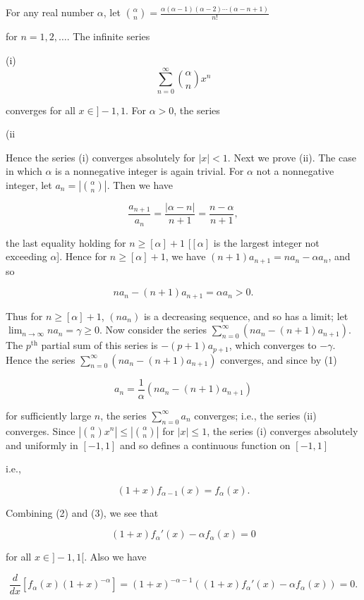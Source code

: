 For any real number $\alpha$, let $\binom{\alpha}{n} = \frac{\alpha(\alpha - 1)(\alpha - 2) \cdots (\alpha - n + 1)}{n!}$

for $n = 1, 2, \ldots$. The infinite series

(i) $$\sum_{n=0}^{\infty} \binom{\alpha}{n} x^n$$

converges for all $x \in ]-1, 1$. For $\alpha > 0$, the series

(ii

Hence the series (i) converges absolutely for $|x| < 1$. Next we prove (ii). The case in which $\alpha$ is a nonnegative integer is again trivial. For $\alpha$ not a nonnegative integer, let $a_n = \left| \binom{\alpha}{n} \right|$. Then we have

$$\frac{a_{n+1}}{a_n} = \frac{|\alpha - n|}{n+1} = \frac{n - \alpha}{n+1},$$

the last equality holding for $n \geq [\alpha] + 1$ $[[\alpha]$ is the largest integer not exceeding $\alpha$]. Hence for $n \geq [\alpha] + 1$, we have $(n+1)a_{n+1} = na_n - \alpha a_n$, and so

$$na_n - (n+1)a_{n+1} = \alpha a_n > 0.$$

Thus for $n \geq [\alpha] + 1$, $(na_n)$ is a decreasing sequence, and so has a limit; let $\lim_{n \to \infty} na_n = \gamma \geq 0$. Now consider the series $\sum_{n=0}^{\infty} (na_n - (n+1)a_{n+1})$. The $p^{\text{th}}$ partial sum of this series is $-(p+1)a_{p+1}$, which converges to $-\gamma$. Hence the series $\sum_{n=0}^{\infty} (na_n - (n+1)a_{n+1})$ converges, and since by (1)

$$a_n = \frac{1}{\alpha} (na_n - (n+1)a_{n+1})$$

for sufficiently large $n$, the series $\sum_{n=0}^{\infty} a_n$ converges; i.e., the series (ii) converges. Since $\left| \binom{\alpha}{n} x^n \right| \leq \left| \binom{\alpha}{n} \right|$ for $|x| \leq 1$, the series (i) converges absolutely and uniformly in $[-1, 1]$ and so defines a continuous function on $[-1, 1]$

i.e.,

$$ (1 + x) f_{\alpha - 1}(x) = f_{\alpha}(x). $$

Combining (2) and (3), we see that

$$ (1 + x) f_{\alpha}'(x) - \alpha f_{\alpha}(x) = 0 $$

for all $x \in ] - 1, 1[$. Also we have

$$ \frac{d}{dx} \left[ f_{\alpha}(x) (1 + x)^{-\alpha} \right] = (1 + x)^{-\alpha - 1} \left( (1 + x) f_{\alpha}'(x) - \alpha f_{\alpha}(x) \right) = 0. $$

